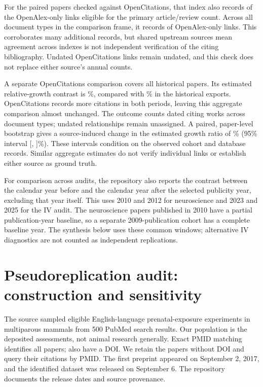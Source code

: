 \documentclass[11pt,letterpaper]{article}
\begin{document}
For the \NwValidationPapers{} paired papers checked against OpenCitations, that index also records \NwExtraPrimaryCorroborated{} of the \NwExtraPrimary{} OpenAlex-only links eligible for the primary article/review count. Across all document types in the comparison frame, it records \NwExtraCorroborated{} of \NwExtraAll{} OpenAlex-only links. This corroborates many additional records, but shared upstream sources mean agreement across indexes is not independent verification of the citing bibliography. Undated OpenCitations links remain undated, and this check does not replace either source's annual counts.

A separate OpenCitations comparison covers all \NwOcPapers{} historical papers. Its estimated relative-growth contrast is \NwOcPercent\%, compared with \NwOcWosPercent\% in the historical exports. OpenCitations records more citations in both periods, leaving this aggregate comparison almost unchanged. The outcome counts dated citing works across document types; \NwOcUndated{} undated relationships remain unassigned. A paired, paper-level bootstrap gives a source-induced change in the estimated growth ratio of \NwOcDifference\% (95\% interval [\NwOcDifferenceLower, \NwOcDifferenceUpper]\%). These intervals condition on the observed cohort and database records. Similar aggregate estimates do not verify individual links or establish either source as ground truth.


For comparison across audits, the repository also reports the contrast between the calendar year before and the calendar year after the selected publicity year, excluding that year itself. This uses 2010 and 2012 for neuroscience and 2023 and 2025 for the IV audit. The neuroscience papers published in 2010 have a partial publication-year baseline, so a separate 2009-publication cohort has a complete baseline year. The synthesis below uses these common windows; alternative IV diagnostics are not counted as independent replications.

\section{Pseudoreplication audit: construction and sensitivity}\label{app:lazic}
The source sampled eligible English-language prenatal-exposure experiments in multiparous mammals from 500 PubMed search results. Our population is the \LazicPapers{} deposited assessments, not animal research generally. Exact PMID matching identifies all \LazicPapers{} papers; \LazicDoiPapers{} also have a DOI. We retain the \LazicNoDoiPapers{} papers without DOI and query their citations by PMID. The first preprint appeared on September 2, 2017, and the identified dataset was released on September 6. The repository documents the release dates and source provenance.
\end{document}
